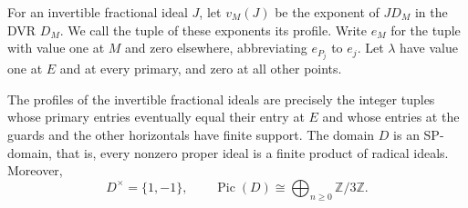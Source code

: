 For an invertible fractional ideal $J$, let $v_M(J)$ be the exponent of $J D_M$ in the DVR $D_M$.
We call the tuple of these exponents its profile.
Write $e_M$ for the tuple with value one at $M$ and zero elsewhere, abbreviating $e_{P_j}$ to $e_j$.
Let $\lambda$ have value one at $E$ and at every primary, and zero at all other points.

\begin{proposition}
    \label{prop:ideals}
    The profiles of the invertible fractional ideals are precisely the integer tuples whose primary entries eventually equal their entry at $E$ and whose entries at the guards and the other horizontals have finite support.
    The domain $D$ is an SP-domain, that is, every nonzero proper ideal is a finite product of radical ideals.
    Moreover,
    \[
        D^\times = \{1, -1\},
        \qquad
        \operatorname{Pic}(D) \cong \bigoplus_{n \ge 0} \mathbb{Z}/3\mathbb{Z}.
    \]
\end{proposition}

